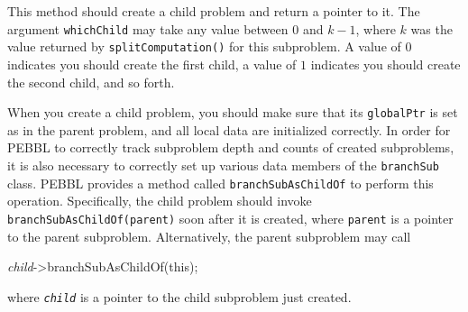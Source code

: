 This method should create a child problem and return a pointer to it.  
The argument
\texttt{whichChild} may take any value between $0$ and $k-1$, where $k$
was the value returned by \texttt{splitComputation()} for this
subproblem.  
A value of $0$ indicates you should create the first child, a
value of $1$ indicates you should create the second child, and so
forth.  

When you create a child problem, you should make sure that its
\texttt{globalPtr} is set as in the parent problem, and all local
data are initialized correctly.  In order for PEBBL to correctly track
subproblem depth and counts of created subproblems, it is also necessary to
correctly set up various data members of the \texttt{branchSub} class.  PEBBL
provides a method called \texttt{branchSubAsChildOf} to perform this
operation.  Specifically, the child problem should invoke
\texttt{branchSubAsChildOf(parent)} soon after it is created, where
\texttt{parent} is a pointer to the parent subproblem.  Alternatively, the parent
subproblem may call
\begin{codeblock}
\emph{child}->branchSubAsChildOf(this);
\end{codeblock}
where \emph{\texttt{child}} is a pointer to the child subproblem just created.




